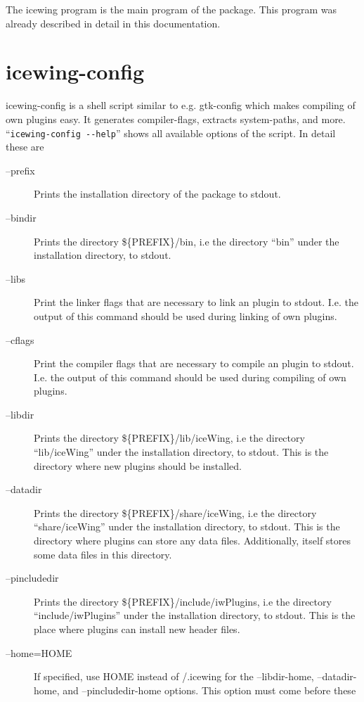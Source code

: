 The icewing program is the main program of the \icewing{}
package. This program was already described in detail in this
documentation.

\section{icewing-config}
\label{sec:icewing-config}

icewing-config is a shell script similar to e.g. gtk-config which
makes compiling of own plugins easy. It generates compiler-flags,
extracts system-paths, and more. ``\verb|icewing-config --help|''
shows all available options of the script. In detail these are

\begin{description}
\item[--prefix] Prints the installation directory of the \icewing{}
  package to stdout.
\item[--bindir] Prints the directory \$\{PREFIX\}/bin, i.e the
  directory ``bin'' under the installation directory, to stdout.
\item[--libs] Print the linker flags that are necessary to link an
  \icewing{} plugin to stdout. I.e. the output of this command
  should be used during linking of own plugins.
\item[--cflags] Print the compiler flags that are necessary to
  compile an \icewing{} plugin to stdout. I.e. the output of this
  command should be used during compiling of own plugins.
\item[--libdir] Prints the directory \$\{PREFIX\}/lib/iceWing, i.e the
  directory ``lib/iceWing'' under the installation directory, to
  stdout. This is the directory where new plugins should be
  installed.
\item[--datadir] Prints the directory \$\{PREFIX\}/share/iceWing, i.e
  the directory ``share/iceWing'' under the installation directory,
  to stdout. This is the directory where plugins can store any
  data files. Additionally, \icewing{} itself stores some data files
  in this directory.
\item[--pincludedir] Prints the directory
  \$\{PREFIX\}/include/iwPlugins, i.e the directory
  ``include/iwPlugins'' under the installation directory, to
  stdout. This is the place where plugins can install new header
  files.
\item[--home=HOME] If specified, use HOME instead of
  \urltilde{}/.icewing for the --libdir-home, --datadir-home, and
  --pincludedir-home options. This option must come before these

\end{description}
